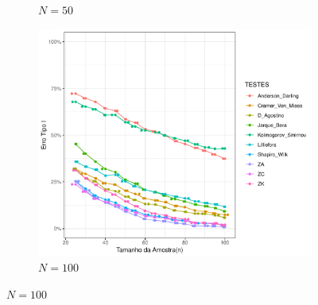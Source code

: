 \documentclass[final]{beamer}
\begin{document}
\begin{frame}[t]
\begin{columns}[t,totalwidth=0.6\paperwidth]
\begin{column}{0.45\textwidth}
\begin{figure}[H]
\begin{subfigure}[b]{0.3\textwidth}
        \caption{\(N = 50\)}
        \label{fig:beta_50}
    \end{subfigure}
    \hfill
    \begin{subfigure}[b]{0.3\textwidth}
        \centering
        \includegraphics[width=\textwidth]{Distribuição_Beta/Erro_TipoI/erro_tipo_I_beta_100.pdf}
        \caption{\(N = 100\)}
        \label{fig:beta_100}
    \end{subfigure}
    \label{fig:erro_tipoI_beta}
\end{figure}




\end{column}
\end{columns}
\end{frame}
\end{document}
